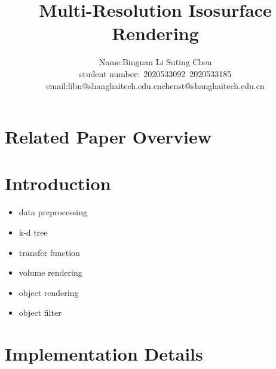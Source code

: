\documentclass[acmtog]{acmart}
\title{Multi-Resolution Isosurface Rendering}
\author{Name:\quad Bingnan Li \quad Suting Chen \\ student number:\ 2020533092\ 2020533185
\\email:\quad libn@shanghaitech.edu.cn\quad chenst@shanghaitech.edu.cn}
\begin{document}
    \maketitle

    \vspace*{2 ex}


    \section{Related Paper Overview}\label{sec:related-paper-overview}


    \section{Introduction}\label{sec:introduction}
    \begin{itemize}
        \item data preprocessing
        \item k-d tree
        \item transfer function
        \item volume rendering
        \item object rendering
        \item object filter
    \end{itemize}


    \section{Implementation Details}\label{sec:implementation-details}
\end{document}
